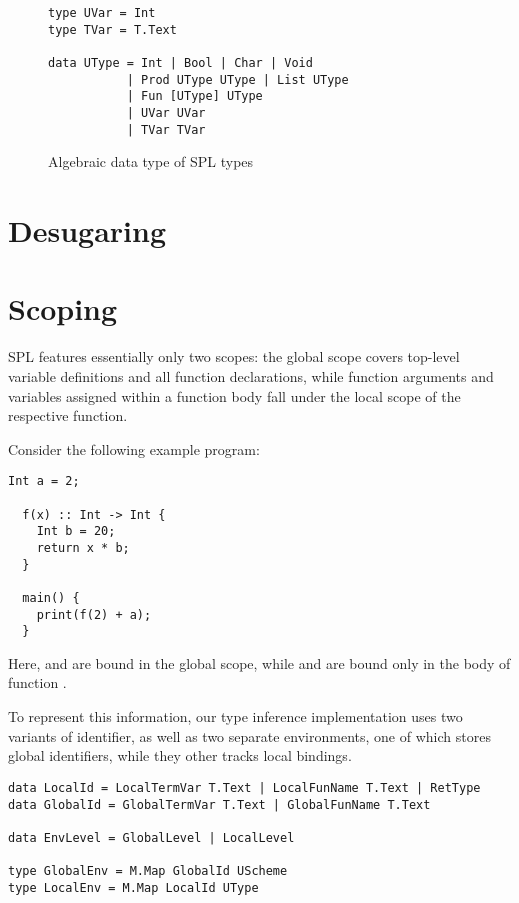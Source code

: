 \begin{figure}
\begin{verbatim}
type UVar = Int
type TVar = T.Text

data UType = Int | Bool | Char | Void
           | Prod UType UType | List UType
           | Fun [UType] UType
           | UVar UVar
           | TVar TVar
\end{verbatim}

  \caption{Algebraic data type of SPL types}
  \label{fig:type-adt}
\end{figure}


\section{Desugaring} \label{sec:desugaring}

\section{Scoping}
SPL features essentially only two scopes: the global scope covers top-level
variable definitions and all function declarations, while function arguments
and variables assigned within a function body fall under the local scope of the
respective function.

Consider the following example program:
%
\begin{lstlisting}[language=SPL]
  Int a = 2;

  f(x) :: Int -> Int {
    Int b = 20;
    return x * b;
  }

  main() {
    print(f(2) + a);
  }
\end{lstlisting}
%
Here,  and  are bound in the global scope, while  and
 are bound only in the body of function .

To represent this information, our type inference implementation uses two
variants of identifier, as well as two separate environments, one of which
stores global identifiers, while they other tracks local bindings.

\begin{verbatim}
data LocalId = LocalTermVar T.Text | LocalFunName T.Text | RetType
data GlobalId = GlobalTermVar T.Text | GlobalFunName T.Text

data EnvLevel = GlobalLevel | LocalLevel

type GlobalEnv = M.Map GlobalId UScheme
type LocalEnv = M.Map LocalId UType
\end{verbatim}

